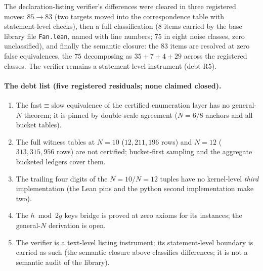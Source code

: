 The declaration-listing verifier's differences were cleared in three registered moves:
$85\to83$ (two targets moved into the correspondence table with statement-level checks),
then a full classification ($8$ items carried by the base library file \texttt{Fan.lean},
named with line numbers; $75$ in eight noise classes, zero unclassified), and finally the
semantic closure: the $83$ items are resolved at zero false equivalences, the $75$
decomposing as $35+7+4+29$ across the registered classes. The verifier remains a
statement-level instrument (debt R5).

\paragraph{The debt list (five registered residuals; none claimed closed).}
\begin{enumerate}[label=\textup{(R\arabic*)},leftmargin=2.6em,itemsep=0.1em]
\item The fast$\equiv$slow equivalence of the certified enumeration layer has no
  general-$N$ theorem; it is pinned by double-scale agreement ($N{=}6/8$ anchors and all
  bucket tables).
\item The full witness tables at $N=10$ ($12{,}211{,}196$ rows) and $N=12$
  ($313{,}315{,}956$ rows) are not certified; bucket-first sampling and the aggregate
  bucketed ledgers cover them.
\item The trailing four digits of the $N{=}10$/$N{=}12$ tuples have no kernel-level
  \emph{third} implementation (the Lean pins and the python second implementation make
  two).
\item The $h\bmod 2g$ keys bridge is proved at zero axioms for its instances; the
  general-$N$ derivation is open.
\item The verifier is a text-level listing instrument; its statement-level boundary is
  carried as such (the semantic closure above classifies differences; it is not a
  semantic audit of the library).
\end{enumerate}

